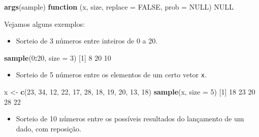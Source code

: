 \documentclass[10pt,a4paper]{book}
\newenvironment{Shaded}{\begin{snugshade}}{\end{snugshade}}
\newcommand{\KeywordTok}[1]{\textcolor[rgb]{0.13,0.29,0.53}{\textbf{#1}}}
\newcommand{\DataTypeTok}[1]{\textcolor[rgb]{0.13,0.29,0.53}{#1}}
\newcommand{\DecValTok}[1]{\textcolor[rgb]{0.00,0.00,0.81}{#1}}
\newcommand{\StringTok}[1]{\textcolor[rgb]{0.31,0.60,0.02}{#1}}
\newcommand{\OtherTok}[1]{\textcolor[rgb]{0.56,0.35,0.01}{#1}}
\newcommand{\ControlFlowTok}[1]{\textcolor[rgb]{0.13,0.29,0.53}{\textbf{#1}}}
\newcommand{\OperatorTok}[1]{\textcolor[rgb]{0.81,0.36,0.00}{\textbf{#1}}}
\newcommand{\NormalTok}[1]{#1}
\providecommand{\tightlist}{%
  \setlength{\itemsep}{0pt}\setlength{\parskip}{0pt}}
\begin{document}
\begin{Shaded}
\begin{Highlighting}[]
\KeywordTok{args}\NormalTok{(sample)}
\ControlFlowTok{function}\NormalTok{ (x, size, }\DataTypeTok{replace =} \OtherTok{FALSE}\NormalTok{, }\DataTypeTok{prob =} \OtherTok{NULL}\NormalTok{) }
\OtherTok{NULL}
\end{Highlighting}
\end{Shaded}

Vejamos alguns exemplos:

\begin{itemize}
\tightlist
\item
  Sorteio de 3 números entre inteiros de 0 a 20.
\end{itemize}

\begin{Shaded}
\begin{Highlighting}[]
\KeywordTok{sample}\NormalTok{(}\DecValTok{0}\OperatorTok{:}\DecValTok{20}\NormalTok{, }\DataTypeTok{size =} \DecValTok{3}\NormalTok{)}
\NormalTok{[}\DecValTok{1}\NormalTok{]  }\DecValTok{8} \DecValTok{20} \DecValTok{10}
\end{Highlighting}
\end{Shaded}

\begin{itemize}
\tightlist
\item
  Sorteio de 5 números entre os elementos de um certo vetor \texttt{x}.
\end{itemize}

\begin{Shaded}
\begin{Highlighting}[]
\NormalTok{x <-}\StringTok{ }\KeywordTok{c}\NormalTok{(}\DecValTok{23}\NormalTok{, }\DecValTok{34}\NormalTok{, }\DecValTok{12}\NormalTok{, }\DecValTok{22}\NormalTok{, }\DecValTok{17}\NormalTok{, }\DecValTok{28}\NormalTok{, }\DecValTok{18}\NormalTok{, }\DecValTok{19}\NormalTok{, }\DecValTok{20}\NormalTok{, }\DecValTok{13}\NormalTok{, }\DecValTok{18}\NormalTok{)}
\KeywordTok{sample}\NormalTok{(x, }\DataTypeTok{size =} \DecValTok{5}\NormalTok{)}
\NormalTok{[}\DecValTok{1}\NormalTok{] }\DecValTok{18} \DecValTok{23} \DecValTok{20} \DecValTok{28} \DecValTok{22}
\end{Highlighting}
\end{Shaded}

\begin{itemize}
\tightlist
\item
  Sorteio de 10 números entre os possíveis resultados do lançamento de
  um dado, com reposição.
\end{itemize}
\end{document}
